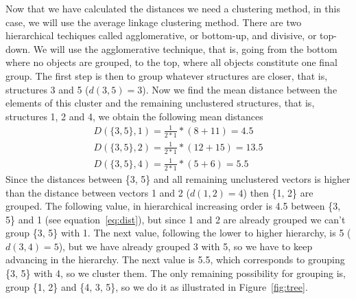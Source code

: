 Now that we have calculated the distances we need a clustering method,
in this case, we will use the average linkage clustering method. There
are two hierarchical techiques called agglomerative, or bottom-up, and
divisive, or  top-down. We will use the  agglomerative technique, that
is, going  from the bottom where  no objects are grouped,  to the top,
where all objects  constitute one final group. The  first step is then
to group whatever  structures are closer, that is,  structures 3 and 5
($d(3, 5)=3$). Now  we find the mean distance  between the elements of
this  cluster  and  the  remaining unclustered  structures,  that  is,
structures 1, 2 and 4, we obtain the following mean distances
\begin{gather}
D(\{3,5\}, 1)=\frac{1}{2*1}*(8+11) = 4.5 \label{eq:dist}\\
D(\{3,5\}, 2)=\frac{1}{2*1}*(12+15) = 13.5\\
D(\{3,5\}, 4)=\frac{1}{2*1}*(5+6) = 5.5
\end{gather}
Since  the distances between  \{3, 5\}  and all  remaining unclustered
vectors is  higher than  the distance between  vectors 1 and  2 ($d(1,
2)=4$) then \{1, 2\} are grouped. The following value, in hierarchical
increasing   order   is   4.5    between   \{3,   5\}   and   1   (see
equation~\ref{eq:dist}),  but since  1 and  2 are  already  grouped we
can't group  \{3, 5\} with 1.  The next value, following  the lower to
higher hierarchy,  is 5 ($d(3, 4)=5$),  but we have  already grouped 3
with 5, so we have to  keep advancing in the hierarchy. The next value
is 5.5, which  corresponds to grouping \{3, 5\} with  4, so we cluster
them. The only  remaining possibility for grouping is,  group \{1, 2\}
and \{4, 3, 5\}, so we do it as illustrated in Figure~\ref{fig:tree}.
